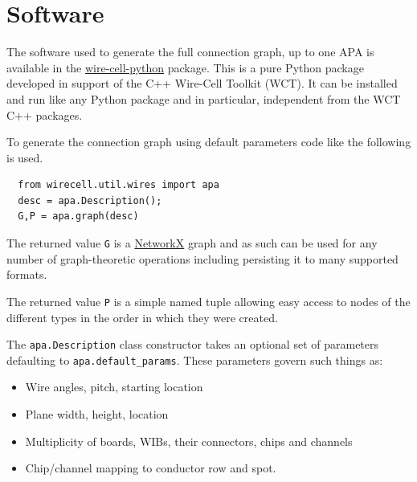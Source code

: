 \documentclass[pdftex,12pt,letter]{article}
\begin{document}
\section{Software}

The software used to generate the full connection graph, up to one APA
is available in the
\href{https://github.com/wirecell/wire-cell-python}{wire-cell-python}
package.  This is a pure Python package developed in support of the
C++ Wire-Cell Toolkit (WCT).  It can be installed and run like any
Python package and in particular, independent from the WCT C++
packages.

To generate the connection graph using default parameters code like
the following is used.

\begin{verbatim}
  from wirecell.util.wires import apa
  desc = apa.Description();
  G,P = apa.graph(desc)
\end{verbatim}

The returned value \texttt{G} is a
\href{https://networkx.github.io/}{NetworkX} graph and as such can be
used for any number of graph-theoretic operations including persisting
it to many supported formats.

The returned value \texttt{P} is a simple named tuple allowing easy
access to nodes of the different types in the order in which they were
created.

The \texttt{apa.Description} class constructor takes an optional set
of parameters defaulting to \texttt{apa.default\_params}.  These
parameters govern such things as:

\begin{itemize}
\item Wire angles, pitch, starting location
\item Plane width, height, location
\item Multiplicity of boards, WIBs, their connectors, chips and channels
\item Chip/channel mapping to conductor row and spot.
\end{itemize}
\end{document}
